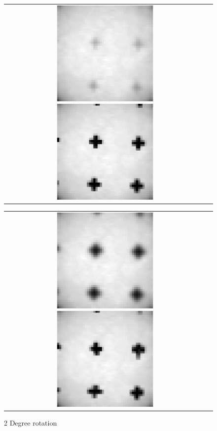 \documentclass[iop]{emulateapj}
\begin{document}
\begin{figure}
        \begin{tabular}{cc}
            \includegraphics[width=0.5\textwidth]{rot_2_1}
            \includegraphics[width=0.5\textwidth]{rot_2_2}
        \end{tabular}
        \begin{tabular}{cc}
            \includegraphics[width=0.5\textwidth]{rot_2_3}
            \includegraphics[width=0.5\textwidth]{rot_2_4}
        \end{tabular}
        \caption{2 Degree rotation}
\end{figure}
\end{document}
